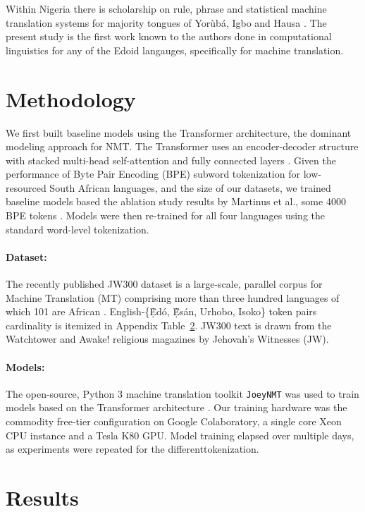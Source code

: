 \documentclass{article} %
\begin{document}
Within Nigeria there is scholarship on rule, phrase and statistical machine translation systems for majority tongues of Yor{\`u}b{\'a}, Igbo and Hausa \citep{odojelanguage}. The present study is the first work known to the authors done in computational linguistics for any of the Edoid langauges, specifically for machine translation.


\section{Methodology}
\label{methods}

We first built baseline models using the Transformer architecture, the dominant modeling approach for NMT. The Transformer uses an encoder-decoder structure with stacked multi-head self-attention and fully connected layers \citep{NIPS2017_7181}. Given the performance of Byte Pair Encoding (BPE) subword tokenization for low-resourced South African languages, and the size of our datasets, we trained baseline models based the ablation study results by Martinus et al., some 4000 BPE tokens \citep{focus_southafrica}. Models were then re-trained for all four languages using the standard word-level tokenization.

\paragraph{Dataset:} The recently published JW300 dataset is a large-scale, parallel corpus for Machine Translation (MT) comprising more than three hundred languages of which 101 are African \citep{agic-vulic-2019-jw300}. English-\{\d{\`E}d{\'o}, \d{\`E}s{\'a}n, Urhobo, Isoko\} token pairs cardinality is itemized in Appendix Table~\ref{results}. JW300 text is drawn from the Watchtower and Awake! religious magazines by Jehovah's Witnesses (JW).

\paragraph{Models:} The open-source, Python 3 machine translation toolkit \texttt{JoeyNMT} was used to train models based on the Transformer architecture \citep{JoeyNMT}. Our training hardware was the commodity free-tier configuration on Google Colaboratory, a single core Xeon CPU instance and a Tesla K80 GPU. Model training elapsed over multiple days, as experiments were repeated for the differenttokenization.

\section{Results}
\label{results}
\end{document}
